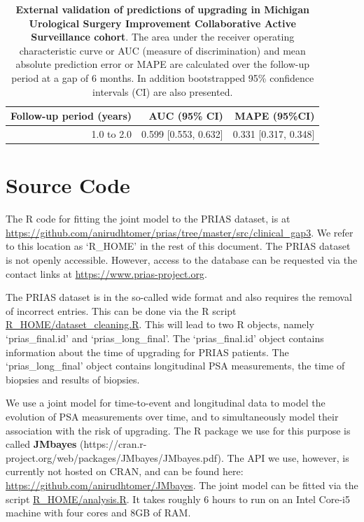 \begin{subappendices}
\begin{table}
\small
\centering
\caption{\textbf{External validation of predictions of upgrading in Michigan Urological Surgery Improvement Collaborative Active Surveillance cohort}. The area under the receiver operating characteristic curve or AUC (measure of discrimination) and mean absolute prediction error or MAPE are calculated over the follow-up period at a gap of 6 months. In addition bootstrapped 95\% confidence intervals (CI) are also presented.}
\label{c5:tab:AUC_PE_MUSIC}
\begin{tabular}{r|r|r}
\hline
\hline
Follow-up period (years) & AUC (95\% CI) & MAPE (95\%CI)\\ 
\hline
1.0 to 2.0 & 0.599 [0.553, 0.632] & 0.331 [0.317, 0.348]\\
\hline
\end{tabular}    
\end{table}

\section{Source Code}
\label{c5:appendix:source_code}
The R code for fitting the joint model to the PRIAS dataset, is at \url{https://github.com/anirudhtomer/prias/tree/master/src/clinical_gap3}. We refer to this location as `R\_HOME' in the rest of this document. The PRIAS dataset is not openly accessible. However, access to the database can be requested via the contact links at \url{https://www.prias-project.org}.

The PRIAS dataset is in the so-called wide format and also requires the removal of incorrect entries. This can be done via the R script \url{R_HOME/dataset_cleaning.R}. This will lead to two R objects, namely `prias\_final.id' and `prias\_long\_final'. The `prias\_final.id' object contains information about the time of upgrading for PRIAS patients. The `prias\_long\_final' object contains longitudinal PSA measurements, the time of biopsies and results of biopsies.

We use a joint model for time-to-event and longitudinal data to model the evolution of PSA measurements over time, and to simultaneously model their association with the risk of upgrading. The R package we use for this purpose is called \textbf{JMbayes} (https://cran.r-project.org/web/packages/JMbayes/JMbayes.pdf). The API we use, however, is currently not hosted on CRAN, and can be found here:
\url{https://github.com/anirudhtomer/JMbayes}. The joint model can be fitted via the script \url{R_HOME/analysis.R}. It takes roughly 6 hours to run on an Intel Core-i5 machine with four cores and 8GB of RAM. 


\end{subappendices}
